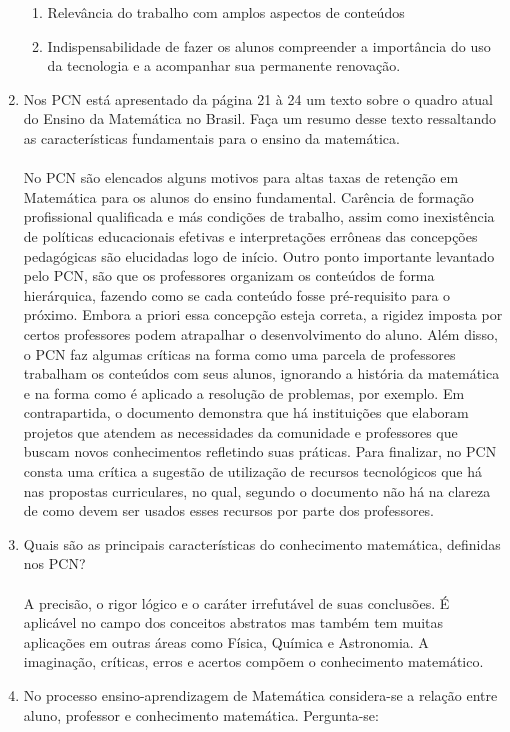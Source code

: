 \documentclass[a4paper, 12pt]{article}
\begin{document}
\begin{enumerate}
\begin{enumerate}
  \item Relevância do trabalho com amplos aspectos de conteúdos
  \item Indispensabilidade de fazer os alunos compreender a importância do uso da tecnologia e a acompanhar sua permanente renovação.
  \end{enumerate}
\item Nos PCN está apresentado da página 21 à 24 um texto sobre o quadro atual do Ensino da Matemática no Brasil. Faça um resumo desse texto ressaltando as características fundamentais para o ensino da matemática. \\ \\
  No PCN são elencados alguns motivos para altas taxas de retenção em Matemática para os alunos do ensino fundamental. Carência de formação profissional qualificada e más condições de trabalho, assim como inexistência de políticas educacionais efetivas e interpretações errôneas das concepções pedagógicas são elucidadas logo de início. Outro ponto importante levantado pelo PCN, são que os professores organizam os conteúdos de forma hierárquica, fazendo como se cada conteúdo fosse pré-requisito para o próximo. Embora a priori essa concepção esteja correta, a rigidez imposta por certos professores podem atrapalhar o desenvolvimento do aluno. Além disso, o PCN faz algumas críticas na forma como uma parcela de professores trabalham os conteúdos com seus alunos, ignorando a história da matemática e na forma como é aplicado a resolução de problemas, por exemplo.
  Em contrapartida, o documento demonstra que há instituições que elaboram projetos que atendem as necessidades da comunidade e professores que buscam novos conhecimentos refletindo suas práticas.
  Para finalizar, no PCN consta uma crítica a sugestão de utilização de recursos tecnológicos que há nas propostas curriculares, no qual, segundo o documento não há na clareza de como devem ser usados esses recursos por parte dos professores.
\item Quais são as principais características do conhecimento matemática, definidas nos PCN? \\ \\
   A precisão, o rigor lógico e o caráter irrefutável de suas conclusões. É aplicável no campo dos conceitos abstratos mas também tem muitas aplicações em outras áreas como Física, Química e Astronomia. A imaginação, críticas, erros e acertos compõem o conhecimento matemático.
\item No processo ensino-aprendizagem de Matemática considera-se a relação entre aluno, professor e conhecimento matemática. Pergunta-se: 

\end{enumerate}
\end{document}
